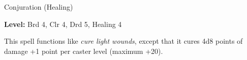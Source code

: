 
Conjuration (Healing)

\textbf{Level:} Brd 4, Clr 4, Drd 5, Healing 4

This spell functions like \textit{cure light wounds}, except that it cures 4d8 
points of damage +1 point per caster level (maximum +20).

